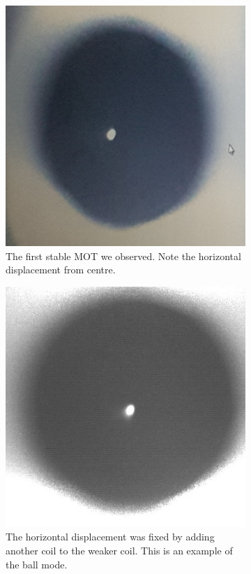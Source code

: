 \documentclass[11pt,twoside,a4paper]{article}
\begin{document}
\begin{figure}[h]
    \centering
    \begin{subfigure}{.3\textwidth}
        \centering
        \includegraphics[width=.7\textwidth]{images/success1}
        \caption{The first stable MOT we observed. Note the horizontal displacement from centre.}
    \end{subfigure}
    \begin{subfigure}{.3\textwidth}
        \centering
        \includegraphics[width=.7\textwidth]{images/success2}
        \caption{The horizontal displacement was fixed by adding another coil to the weaker coil. This is an example of the ball mode.}
    \end{subfigure}
    \begin{subfigure}{.3\textwidth}
        \centering

\end{subfigure}
\end{figure}
\end{document}
